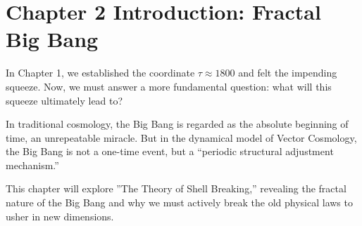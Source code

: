\section*{Chapter 2 Introduction: Fractal Big Bang}

In Chapter 1, we established the coordinate $\tau \approx 1800$ and felt the impending squeeze. Now, we must answer a more fundamental question: what will this squeeze ultimately lead to?

In traditional cosmology, the Big Bang is regarded as the absolute beginning of time, an unrepeatable miracle. But in the dynamical model of Vector Cosmology, the Big Bang is not a one-time event, but a ``periodic structural adjustment mechanism.''

This chapter will explore ''The Theory of Shell Breaking,'' revealing the fractal nature of the Big Bang and why we must actively break the old physical laws to usher in new dimensions.


